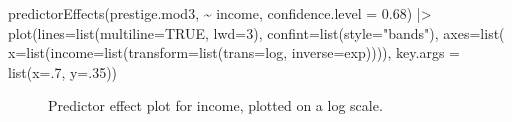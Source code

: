 \documentclass[
  letterpaper,
  10pt,
  krantz2]{krantz}
\makeatletter
\newenvironment{Shaded}{\begin{snugshade}}{\end{snugshade}}
\newcommand{\AttributeTok}[1]{\textcolor[rgb]{0.40,0.45,0.13}{#1}}
\newcommand{\ConstantTok}[1]{\textcolor[rgb]{0.56,0.35,0.01}{#1}}
\newcommand{\DecValTok}[1]{\textcolor[rgb]{0.68,0.00,0.00}{#1}}
\newcommand{\FloatTok}[1]{\textcolor[rgb]{0.68,0.00,0.00}{#1}}
\newcommand{\FunctionTok}[1]{\textcolor[rgb]{0.28,0.35,0.67}{#1}}
\newcommand{\NormalTok}[1]{\textcolor[rgb]{0.00,0.23,0.31}{#1}}
\newcommand{\SpecialCharTok}[1]{\textcolor[rgb]{0.37,0.37,0.37}{#1}}
\newcommand{\StringTok}[1]{\textcolor[rgb]{0.13,0.47,0.30}{#1}}
\newenvironment{kframe}{%
  \medskip{}
  \setlength{\fboxsep}{.8em}
  \def\at@end@of@kframe{}%
  \ifinner\ifhmode%
  \def\at@end@of@kframe{\end{minipage}}%
  \begin{minipage}{\columnwidth}%
  \fi\fi%
  \def\FrameCommand##1{\hskip\@totalleftmargin \hskip-\fboxsep
  \colorbox{shadecolor}{##1}\hskip-\fboxsep
      \hskip-\linewidth \hskip-\@totalleftmargin \hskip\columnwidth}%
  \MakeFramed {\advance\hsize-\width
    \@totalleftmargin\z@ \linewidth\hsize
    \@setminipage}}%
{\par\unskip\endMakeFramed%
  \at@end@of@kframe}
\renewenvironment{Shaded}{\begin{kframe}}{\end{kframe}}
\makeatother
\begin{document}
\begin{Shaded}
\begin{Highlighting}[]
\FunctionTok{predictorEffects}\NormalTok{(prestige.mod3, }\SpecialCharTok{\textasciitilde{}}\NormalTok{ income,}
                 \AttributeTok{confidence.level =} \FloatTok{0.68}\NormalTok{) }\SpecialCharTok{|\textgreater{}}
  \FunctionTok{plot}\NormalTok{(}\AttributeTok{lines=}\FunctionTok{list}\NormalTok{(}\AttributeTok{multiline=}\ConstantTok{TRUE}\NormalTok{, }\AttributeTok{lwd=}\DecValTok{3}\NormalTok{),}
       \AttributeTok{confint=}\FunctionTok{list}\NormalTok{(}\AttributeTok{style=}\StringTok{"bands"}\NormalTok{),}
       \AttributeTok{axes=}\FunctionTok{list}\NormalTok{(}
          \AttributeTok{x=}\FunctionTok{list}\NormalTok{(}\AttributeTok{income=}\FunctionTok{list}\NormalTok{(}\AttributeTok{transform=}\FunctionTok{list}\NormalTok{(}\AttributeTok{trans=}\NormalTok{log, }\AttributeTok{inverse=}\NormalTok{exp)))),}
       \AttributeTok{key.args =} \FunctionTok{list}\NormalTok{(}\AttributeTok{x=}\NormalTok{.}\DecValTok{7}\NormalTok{, }\AttributeTok{y=}\NormalTok{.}\DecValTok{35}\NormalTok{)) }
\end{Highlighting}
\end{Shaded}

\begin{figure}[H]


\caption{\label{fig-prestige-effplot-inc-log}Predictor effect plot for
income, plotted on a log scale.}

\end{figure}%
\end{document}
